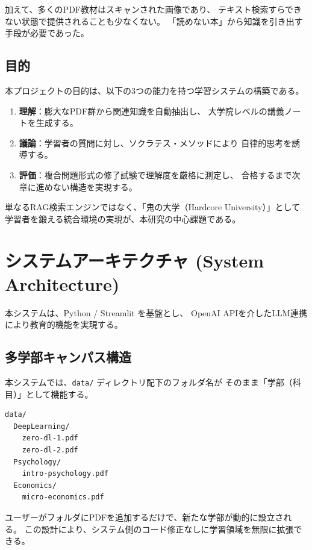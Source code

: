 \documentclass[uplatex, dvipdfmx, a4paper, 11pt]{jsarticle}
\begin{document}
加えて、多くのPDF教材はスキャンされた画像であり、
テキスト検索すらできない状態で提供されることも少なくない。
「読めない本」から知識を引き出す手段が必要であった。

\subsection{目的}
本プロジェクトの目的は、以下の3つの能力を持つ学習システムの構築である。

\begin{enumerate}
    \item \textbf{理解}：膨大なPDF群から関連知識を自動抽出し、
          大学院レベルの講義ノートを生成する。
    \item \textbf{議論}：学習者の質問に対し、ソクラテス・メソッドにより
          自律的思考を誘導する。
    \item \textbf{評価}：複合問題形式の修了試験で理解度を厳格に測定し、
          合格するまで次章に進めない構造を実現する。
\end{enumerate}

単なるRAG検索エンジンではなく、「鬼の大学（Hardcore University）」として
学習者を鍛える統合環境の実現が、本研究の中心課題である。


\section{システムアーキテクチャ (System Architecture)}

本システムは、Python / Streamlit を基盤とし、
OpenAI APIを介したLLM連携により教育的機能を実現する。

\subsection{多学部キャンパス構造}
本システムでは、\texttt{data/} ディレクトリ配下のフォルダ名が
そのまま「学部（科目）」として機能する。

\begin{verbatim}
data/
  DeepLearning/
    zero-dl-1.pdf
    zero-dl-2.pdf
  Psychology/
    intro-psychology.pdf
  Economics/
    micro-economics.pdf
\end{verbatim}

ユーザーがフォルダにPDFを追加するだけで、新たな学部が動的に設立される。
この設計により、システム側のコード修正なしに学習領域を無限に拡張できる。
\end{document}
